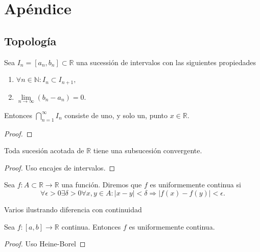 \chapter*{Apéndice}

\section{Topología}

\begin{teorema}{}  Sea $I_n=[a_n,b_n]\subset\mathbb{R}$ una sucessión de intervalos con las siguientes propiedades
\begin{enumerate}
 \item $\forall n\in\mathbb{N}: I_n\subset I_{n+1},$
 \item $\lim\limits_{n\to\infty}(b_n-a_n)=0.$
\end{enumerate}
Entonces $\bigcap_{n=1}^{\infty}I_n$ consiste de uno, y solo un, punto $x\in\mathbb{R}$.
 
\end{teorema}

\begin{proof}
 
\end{proof}





\begin{teorema}{} Toda sucesión acotada de $\mathbb{R}$ 
tiene una subsucesión convergente.
 
\end{teorema}

\begin{proof} Uso encajes de intervalos.
 
\end{proof}


\begin{definicion}{} Sea $f:A\subset\mathbb{R}\to\mathbb{R}$ una función. Diremos que $f$ es uniformemente continua si 
\[
 \forall \epsilon>0\exists \delta>0 \forall x,y\in A:|x-y|<\delta\Rightarrow |f(x)-f(y)|<\epsilon.
 \]

\end{definicion}

\begin{ejemplo} Varios ilustrando diferencia con continuidad
 
\end{ejemplo}


\begin{teorema}{} Sea $f:[a,b]\to\mathbb{R}$ continua. Entonces $f$ es uniformemente continua. 
 \end{teorema}
\begin{proof} Uso Heine-Borel
 \end{proof}

